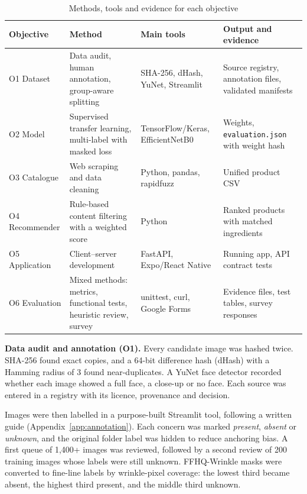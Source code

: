 \begin{table}[ht]
\centering\small
\caption{Methods, tools and evidence for each objective}
\label{tab:methods}
\begin{tabularx}{\linewidth}{P{1.9cm}P{3.6cm}P{3.1cm}Y}
\toprule
\textbf{Objective} & \textbf{Method} & \textbf{Main tools} & \textbf{Output and evidence}\\
\midrule
O1 Dataset & Data audit, human annotation, group-aware splitting & SHA-256, dHash, YuNet, Streamlit & Source registry, annotation files, validated manifests\\
O2 Model & Supervised transfer learning, multi-label with masked loss & TensorFlow/Keras, EfficientNetB0 & Weights, \texttt{evaluation.json} with weight hash\\
O3 Catalogue & Web scraping and data cleaning & Python, pandas, rapidfuzz & Unified product CSV\\
O4 Recommender & Rule-based content filtering with a weighted score & Python & Ranked products with matched ingredients\\
O5 Application & Client--server development & FastAPI, Expo/React Native & Running app, API contract tests\\
O6 Evaluation & Mixed methods: metrics, functional tests, heuristic review, survey & unittest, curl, Google Forms & Evidence files, test tables, survey responses\\
\bottomrule
\end{tabularx}
\end{table}

\textbf{Data audit and annotation (O1).} Every candidate image was hashed twice. SHA-256 found exact copies, and a 64-bit difference hash (dHash) with a Hamming radius of 3 found near-duplicates. A YuNet face detector \citep{wu2023yunet} recorded whether each image showed a full face, a close-up or no face. Each source was entered in a registry with its licence, provenance and decision.

Images were then labelled in a purpose-built Streamlit tool, following a written guide (Appendix~\ref{app:annotation}). Each concern was marked \emph{present}, \emph{absent} or \emph{unknown}, and the original folder label was hidden to reduce anchoring bias. A first queue of 1,400+ images was reviewed, followed by a second review of 200 training images whose labels were still unknown. FFHQ-Wrinkle masks \citep{moon2024} were converted to fine-line labels by wrinkle-pixel coverage: the lowest third became absent, the highest third present, and the middle third unknown.

